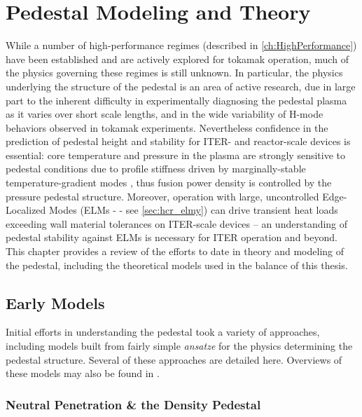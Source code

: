 \chapter{Pedestal Modeling and Theory}\label{ch:Modeling}

While a number of high-performance regimes (described in \cref{ch:HighPerformance}) have been established and are actively explored for tokamak operation, much of the physics governing these regimes is still unknown.  In particular, the physics underlying the structure of the pedestal is an area of active research, due in large part to the inherent difficulty in experimentally diagnosing the pedestal plasma as it varies over short scale lengths, and in the wide variability of H-mode behaviors observed in tokamak experiments.  Nevertheless confidence in the prediction of pedestal height and stability for ITER- and reactor-scale devices is essential: core temperature and pressure in the plasma are strongly sensitive to pedestal conditions due to profile stiffness driven by marginally-stable temperature-gradient modes \cite{Hubbard1998}, thus fusion power density is controlled by the pressure pedestal structure.  Moreover, operation with large, uncontrolled Edge-Localized Modes (ELMs -
- see \cref{sec:hcr_elmy}) can drive transient heat loads exceeding wall material tolerances on ITER-scale devices \cite{Loarte2003,Federici2003} -- an understanding of pedestal stability against ELMs is necessary for ITER operation and beyond.  This chapter provides a review of the efforts to date in theory and modeling of the pedestal, including the theoretical models used in the balance of this thesis.\nicesectionending{}

\section{Early Models}\label{sec:mod_early}

Initial efforts in understanding the pedestal took a variety of approaches, including models built from fairly simple \emph{ans\:atze} for the physics determining the pedestal structure.  Several of these approaches are detailed here.  Overviews of these models may also be found in \cite[\S 2]{Hubbard2000,Hughes2005}.

\subsection{Neutral Penetration \& the Density Pedestal}\label{subsec:mod_neutral}

